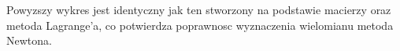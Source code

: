 \documentclass{article}
\begin{document}
	Powyzszy wykres jest identyczny jak ten stworzony na podstawie macierzy oraz metoda Lagrange'a, co potwierdza poprawnosc wyznaczenia wielomianu metoda Newtona.
	
	
	
	
	
	
	
	
	
	
	
	
	
	
	
	
	
	
	
	
	
	
	
	
	
	
	
	
	
	
\end{document}
